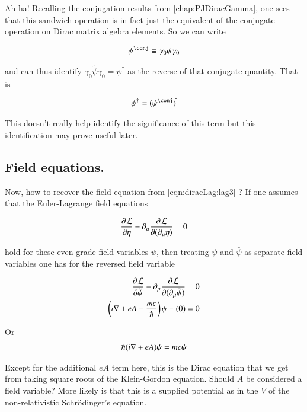 Ah ha!  Recalling the conjugation results from \ref{chap:PJDiracGamma}, one sees that this sandwich operation is in fact just the equivalent of the conjugate operation on Dirac matrix algebra elements.  So we can write

\begin{align*}
\psi^\conj \equiv \gamma_0 \psi \gamma_0
\end{align*}

and can thus identify $\gamma_0 \tilde{\psi} \gamma_0 = \psi^\dagger$ as the reverse of that conjugate quantity.  That is

\begin{align*}
\psi^\dagger = (\psi^\conj)^{\tilde{}}
\end{align*}

This doesn't really help identify the significance of this term but this identification may prove useful later.

\subsection{Field equations. }

Now, how to recover the field equation from \ref{eqn:diracLag:lag3} 
?  If one assumes that the Euler-Lagrange field equations

\begin{align*}
\frac{\partial {\mathcal{L}}}{\partial {\eta}} - \partial_\mu \frac{\partial {\mathcal{L}}}{\partial {(\partial_\mu \eta)}} = 0
\end{align*}

hold for these even grade field variables $\psi$, then treating $\psi$ and $\bar \psi$ as separate field variables one has for the reversed field variable

\begin{align*}
\frac{\partial {\mathcal{L}}}{\partial {\tilde{\psi}}} - \partial_\mu \frac{\partial {\mathcal{L}}}{\partial {(\partial_\mu \tilde{\psi})}} &= 0 \\
\left( i \nabla + e A - \frac{mc}{\hbar}\right) \psi - (0) &= 0
\end{align*}

Or 
\begin{align*}
\hbar (i \nabla + e A) \psi = mc \psi
\end{align*}

Except for the additional $e A$ term here, this is the Dirac equation that we get from taking square roots of the Klein-Gordon equation.  Should $A$ be considered a field variable?  More likely is that this is a supplied potential as in the $V$ of the non-relativistic 
Schr\"{o}dinger's equation.

